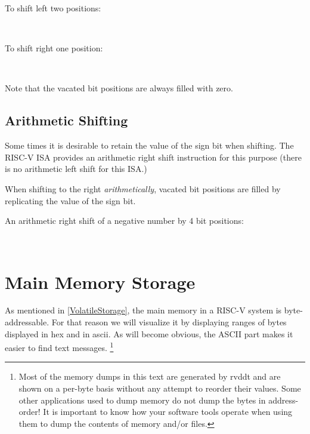 %
To shift left two positions:

\\

To shift right one position:

\\

\begin{tcolorbox}
Note that the vacated bit positions are always filled with zero.
\end{tcolorbox}

\subsection{Arithmetic Shifting}

Some times it is desirable to retain the value of the sign bit when
shifting.  The RISC-V ISA provides an arithmetic right shift 
instruction for this purpose (there is no arithmetic left shift for 
this ISA.)

\begin{tcolorbox}
When shifting to the right {\em arithmetically}, vacated bit positions are
filled by replicating the value of the sign bit. 
\end{tcolorbox}

An arithmetic right shift of a negative number by 4 bit positions:

\\

\section{Main Memory Storage}

As mentioned in \autoref{VolatileStorage}, the main memory in a RISC-V 
system is byte-addressable.  For that reason we will visualize it by 
displaying ranges of bytes displayed in hex and in \gls{ascii}.  As will 
become obvious, the ASCII part makes it easier to find text messages.%
\footnote{Most of the memory dumps in this text are generated by \gls{rvddt}
and are shown on a per-byte basis without any attempt to reorder their
values. Some other applications used to dump memory do not dump the bytes
in address-order!  It is important to know how your software tools operate
when using them to dump the contents of memory and/or files.}

